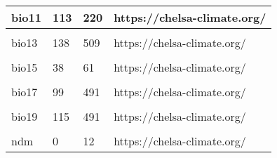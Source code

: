 \documentclass[
]{article}
\begin{document}
\begin{table}
{\begin{tabular}{l|l|l|l}
\hline
bio11 & 113 & 220 & https://chelsa-climate.org/\\
\hline
\cellcolor{gray!6}{bio12} & \cellcolor{gray!6}{903} & \cellcolor{gray!6}{3277} & \cellcolor{gray!6}{https://chelsa-climate.org/}\\
\hline
bio13 & 138 & 509 & https://chelsa-climate.org/\\
\hline
\cellcolor{gray!6}{bio14} & \cellcolor{gray!6}{26} & \cellcolor{gray!6}{143} & \cellcolor{gray!6}{https://chelsa-climate.org/}\\
\hline
bio15 & 38 & 61 & https://chelsa-climate.org/\\
\hline
\cellcolor{gray!6}{bio16} & \cellcolor{gray!6}{368} & \cellcolor{gray!6}{1349} & \cellcolor{gray!6}{https://chelsa-climate.org/}\\
\hline
bio17 & 99 & 491 & https://chelsa-climate.org/\\
\hline
\cellcolor{gray!6}{bio18} & \cellcolor{gray!6}{368} & \cellcolor{gray!6}{1349} & \cellcolor{gray!6}{https://chelsa-climate.org/}\\
\hline
bio19 & 115 & 491 & https://chelsa-climate.org/\\
\hline
\cellcolor{gray!6}{cwd} & \cellcolor{gray!6}{0} & \cellcolor{gray!6}{3297} & \cellcolor{gray!6}{https://chelsa-climate.org/}\\
\hline
ndm & 0 & 12 & https://chelsa-climate.org/\\
\hline
\end{tabular}}
\endgroup{}
\end{table}
\end{document}

